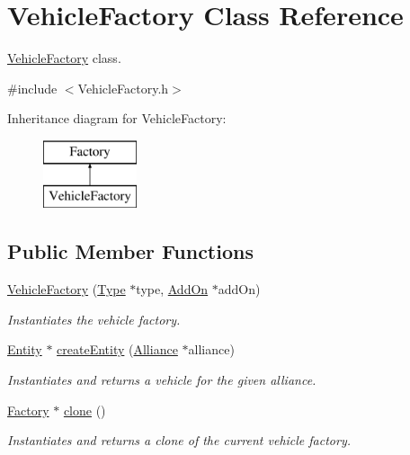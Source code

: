 \hypertarget{classVehicleFactory}{}\section{Vehicle\+Factory Class Reference}
\label{classVehicleFactory}


\hyperlink{classVehicleFactory}{Vehicle\+Factory} class.  




{\ttfamily \#include $<$Vehicle\+Factory.\+h$>$}

Inheritance diagram for Vehicle\+Factory\+:\begin{figure}[H]
\begin{center}
\leavevmode
\includegraphics[height=2.000000cm]{classVehicleFactory}
\end{center}
\end{figure}
\subsection*{Public Member Functions}
\begin{DoxyCompactItemize}
\item 
\hyperlink{classVehicleFactory_a9bc9faf52aef1ad02193b3640b661f59}{Vehicle\+Factory} (\hyperlink{classType}{Type} $\ast$type, \hyperlink{classAddOn}{Add\+On} $\ast$add\+On)
\begin{DoxyCompactList}\small\item\em Instantiates the vehicle factory. \end{DoxyCompactList}\item 
\hyperlink{classEntity}{Entity} $\ast$ \hyperlink{classVehicleFactory_a3f34221921fd58cf83fd9bc8e3d8798f}{create\+Entity} (\hyperlink{classAlliance}{Alliance} $\ast$alliance)
\begin{DoxyCompactList}\small\item\em Instantiates and returns a vehicle for the given alliance. \end{DoxyCompactList}\item 
\hyperlink{classFactory}{Factory} $\ast$ \hyperlink{classVehicleFactory_a6d874e37b573b491a49e303209ac42cd}{clone} ()
\begin{DoxyCompactList}\small\item\em Instantiates and returns a clone of the current vehicle factory. \end{DoxyCompactList}\end{DoxyCompactItemize}


